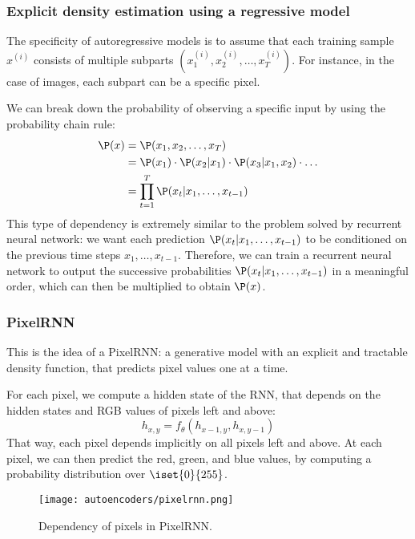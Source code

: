 \subsubsection{Explicit density estimation using a regressive model}
The specificity of autoregressive models is to assume that each training sample $x^{(i)}$ consists of multiple subparts $(x_1^{(i)}, x_2^{(i)}, \dots, x_T^{(i)})$. For instance, in the case of images, each subpart can be a specific pixel.

We can break down the probability of observing a specific input by using the probability chain rule:
\begin{equation*}
    \begin{aligned}
        \P(x) &= \P(x_1, x_2, \dots, x_T)\\
        &= \P(x_1) \cdot \P(x_2|x_1) \cdot \P(x_3|x_1, x_2)\cdot \dots\\
        &= \prod_{t=1}^T \P(x_t|x_1, \dots, x_{t-1})
    \end{aligned}
\end{equation*}
This type of dependency is extremely similar to the problem solved by recurrent neural network: we want each prediction $\P(x_t|x_1, \dots, x_{t-1})$ to be conditioned on the previous time steps $x_1, \dots, x_{t-1}$. Therefore, we can train a recurrent neural network to output the successive probabilities $\P(x_t|x_1, \dots, x_{t-1})$ in a meaningful order, which can then be multiplied to obtain $\P(x)$.

\subsubsection{PixelRNN}
This is the idea of a PixelRNN: a generative model with an explicit and tractable density function, that predicts pixel values one at a time.

For each pixel, we compute a hidden state of the RNN, that depends on the hidden states and RGB values of pixels left and above:
\begin{equation*}
    h_{x,y} = f_\theta(h_{x-1,y}, h_{x, y-1})
\end{equation*}
That way, each pixel depends implicitly on all pixels left and above.
At each pixel, we can then predict the red, green, and blue values, by computing a probability distribution over $\iset{0}{255}$. 
\begin{figure}[H]
    \centering
    \texttt{[image: autoencoders/pixelrnn.png]} 
    \caption{Dependency of pixels in PixelRNN.}
\end{figure}

